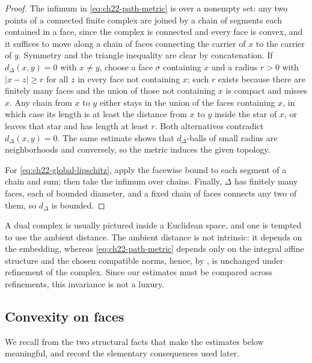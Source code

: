 \begin{proof}
The infimum in \eqref{eq:ch22-path-metric} is over a nonempty set: any two
points of a connected finite complex are joined by a chain of segments each
contained in a face, since the complex is connected and every face is
convex, and it suffices to move along a chain of faces connecting the
carrier of \(x\) to the carrier of \(y\).  Symmetry and the triangle
inequality are clear by concatenation.  If \(d_\Delta(x,y)=0\) with
\(x\neq y\), choose a face \(\sigma\) containing \(x\) and a radius
\(r>0\) with \(|x-z|\geq r\) for all \(z\) in every face not containing
\(x\); such \(r\) exists because there are finitely many faces and the union
of those not containing \(x\) is compact and misses \(x\).  Any chain from
\(x\) to \(y\) either stays in the union of the faces containing \(x\), in
which case its length is at least the distance from \(x\) to \(y\) inside
the star of \(x\), or leaves that star and has length at least \(r\).  Both
alternatives contradict \(d_\Delta(x,y)=0\).  The same estimate shows that
\(d_\Delta\)-balls of small radius are neighborhoods and conversely, so the
metric induces the given topology.

For \eqref{eq:ch22-global-lipschitz}, apply the facewise bound to each
segment of a chain and sum; then take the infimum over chains.  Finally,
\(\Delta\) has finitely many faces, each of bounded diameter, and a fixed
chain of faces connects any two of them, so \(d_\Delta\) is bounded.
\end{proof}

\begin{remark}
\label{rem:ch22-path-metric-choice}
A dual complex is usually pictured inside a Euclidean space, and one is
tempted to use the ambient distance.  The ambient distance is not intrinsic:
it depends on the embedding, whereas
\eqref{eq:ch22-path-metric} depends only on the integral affine structure
and the chosen compatible norms, hence, by
, is unchanged under refinement of
the complex.  Since our estimates must be compared across refinements, this
invariance is not a luxury.
\end{remark}

\subsection{Convexity on faces}

We recall from  the two structural facts that make the
estimates below meaningful, and record the elementary consequences used
later.

